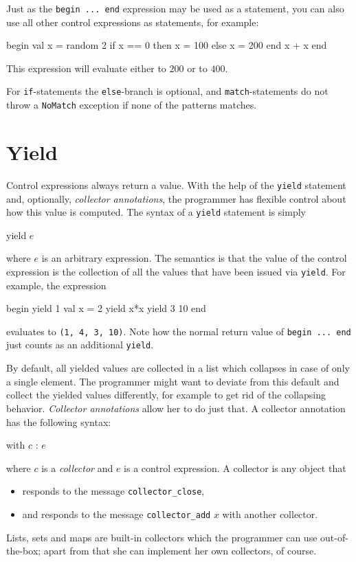 \documentclass[11pt]{amsart}
\newcommand{\babelsrc}[1] {\lstinline!#1!}
\begin{document}
Just as  the \babelsrc{begin ... end} expression may be used as a statement, 
you can also use all other control expressions as statements, for example:
\begin{babellisting}
begin
  val x = random 2
  if x == 0 then
    x = 100
  else
    x = 200
  end
  x + x
end
\end{babellisting}
This expression will evaluate either to $200$ or to $400$.

For \babelsrc{if}-statements the \babelsrc{else}-branch is optional, and \babelsrc{match}-statements do not throw a \babelsrc{NoMatch} exception if none of the patterns matches. 

\section{Yield}
Control expressions always return a value. With the help of the \babelsrc{yield} statement and, optionally, \emph{collector annotations}, the programmer has flexible control about how this value is computed. The syntax of a \babelsrc{yield} statement is simply
\begin{babellisting}
yield $e$
\end{babellisting} 
where $e$ is an arbitrary expression. The semantics is that the value of the control expression is the collection of all the values that have been issued via \babelsrc{yield}. For example, the expression
\begin{babellisting}
begin
  yield 1
  val x = 2
  yield x*x
  yield 3
  10
end
\end{babellisting}
evaluates to \texttt{(1, 4, 3, 10)}. Note how the normal return value of \babelsrc{begin ... end} just counts as an additional \babelsrc{yield}. 

By default, all yielded values are collected in a list which collapses in case of only a single element. The programmer might want to deviate from this default and collect the yielded values differently, for example to get rid of the collapsing behavior. \emph{Collector annotations} allow her to do just that. A collector annotation has the following syntax:
\begin{babellisting}
with $c$ : $e$
\end{babellisting}
where $c$ is a \emph{collector} and $e$ is a control expression. A collector is any object that 
\begin{itemize}
\item responds to the message \verb+collector_close+,
\item and responds to the message \verb+collector_add+ $x$ with another collector.
\end{itemize}
Lists, sets and maps are built-in collectors which the programmer can use out-of-the-box; apart from that she can implement her own collectors, of course.
\end{document}
